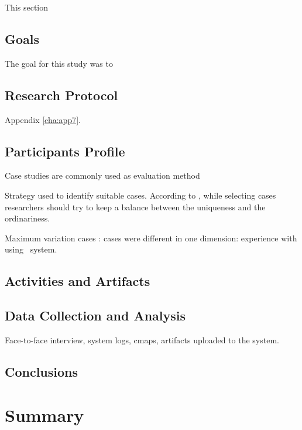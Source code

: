 This section

\subsection{Goals}

The goal for this study was to

\subsection{Research Protocol}

Appendix \ref{cha:app7}.

\subsection{Participants Profile}

Case studies are commonly used as evaluation method \citep{Yin2012}

 Strategy used to identify suitable cases. According to \citet{Stake1995},
 while selecting cases researchers should try to keep a balance between the
 uniqueness and the ordinariness.

Maximum variation cases \citep{Flyvbjerg2006}: cases were different in
one dimension: experience with using \ep~system.

\subsection{Activities and Artifacts}



\subsection{Data Collection and Analysis}

Face-to-face interview, system logs, cmaps, artifacts uploaded to the system.

\subsection{Conclusions}
 
\section{Summary}
